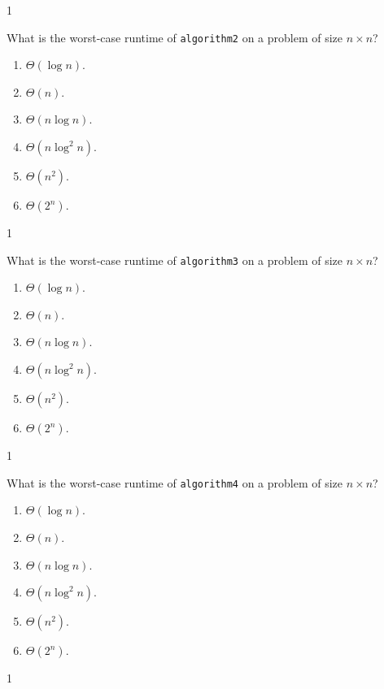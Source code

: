 \documentclass[12pt,twoside]{article}
\begin{document}
\begin{exercises}
\begin{problemparts}
\ifsolution \solution{}
1
\fi

\problempart {} What is the worst-case runtime of \texttt{algorithm2} on a problem of size $n \times n$?
\begin{enumerate}
\item $\Theta(\log n)$.
\item $\Theta(n)$.
\item $\Theta(n \log n)$.
\item $\Theta(n \log^2 n)$.
\item $\Theta(n^2)$.
\item $\Theta(2^n)$.
\end{enumerate}

\ifsolution \solution{}
1
\fi

\problempart {} What is the worst-case runtime of \texttt{algorithm3} on a problem of size $n \times n$?
\begin{enumerate}
\item $\Theta(\log n)$.
\item $\Theta(n)$.
\item $\Theta(n \log n)$.
\item $\Theta(n \log^2 n)$.
\item $\Theta(n^2)$.
\item $\Theta(2^n)$.
\end{enumerate}

\ifsolution \solution{}
1
\fi

\problempart {} What is the worst-case runtime of \texttt{algorithm4} on a problem of size $n \times n$?
\begin{enumerate}
\item $\Theta(\log n)$.
\item $\Theta(n)$.
\item $\Theta(n \log n)$.
\item $\Theta(n \log^2 n)$.
\item $\Theta(n^2)$.
\item $\Theta(2^n)$.
\end{enumerate}

\ifsolution \solution{}
1
\fi

\end{problemparts}


\end{exercises}
\end{document}
